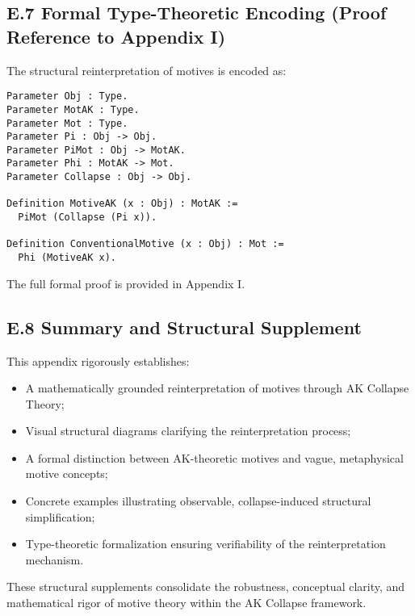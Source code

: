\documentclass[11pt]{article}
\begin{document}
\subsection*{E.7 Formal Type-Theoretic Encoding (Proof Reference to Appendix I)}

The structural reinterpretation of motives is encoded as:

\begin{lstlisting}[language=Coq, caption=Formal Encoding of Motive Reinterpretation]
Parameter Obj : Type.
Parameter MotAK : Type.
Parameter Mot : Type.
Parameter Pi : Obj -> Obj.
Parameter PiMot : Obj -> MotAK.
Parameter Phi : MotAK -> Mot.
Parameter Collapse : Obj -> Obj.

Definition MotiveAK (x : Obj) : MotAK :=
  PiMot (Collapse (Pi x)).

Definition ConventionalMotive (x : Obj) : Mot :=
  Phi (MotiveAK x).
\end{lstlisting}

The full formal proof is provided in Appendix I.

\subsection*{E.8 Summary and Structural Supplement}

This appendix rigorously establishes:

\begin{itemize}
    \item A mathematically grounded reinterpretation of motives through AK Collapse Theory;
    \item Visual structural diagrams clarifying the reinterpretation process;
    \item A formal distinction between AK-theoretic motives and vague, metaphysical motive concepts;
    \item Concrete examples illustrating observable, collapse-induced structural simplification;
    \item Type-theoretic formalization ensuring verifiability of the reinterpretation mechanism.
\end{itemize}

These structural supplements consolidate the robustness, conceptual clarity, and mathematical rigor of motive theory within the AK Collapse framework.

\FloatBarrier


\end{document}
